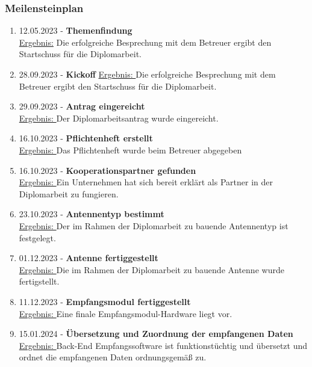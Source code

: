 \subsubsection{Meilensteinplan}

\begin{enumerate}
	\item 12.05.2023 - \textbf{Themenfindung}\\
	\underline{Ergebnis:} Die erfolgreiche Besprechung mit dem Betreuer ergibt den Startschuss für die 
	Diplomarbeit.
	
	\item 28.09.2023 - \textbf{Kickoff}
	\underline{Ergebnis: }Die erfolgreiche Besprechung mit dem Betreuer ergibt den Startschuss für die 
	Diplomarbeit.
	
	\item 29.09.2023 - \textbf{Antrag eingereicht}\\
	\underline{Ergebnis: }Der Diplomarbeitsantrag wurde eingereicht.
	
	\item 16.10.2023 - \textbf{Pflichtenheft erstellt}\\
	\underline{Ergebnis: }Das Pflichtenheft wurde beim Betreuer abgegeben 
	
	\item 16.10.2023 - \textbf{Kooperationspartner gefunden}\\
	\underline{Ergebnis: }Ein Unternehmen hat sich bereit erklärt als Partner in der Diplomarbeit zu fungieren. 
	
	\item 23.10.2023 - \textbf{Antennentyp bestimmt}\\
	\underline{Ergebnis: }Der im Rahmen der Diplomarbeit zu bauende Antennentyp ist festgelegt. 
	
	\item 01.12.2023 - \textbf{Antenne fertiggestellt}\\
	\underline{Ergebnis: }Die im Rahmen der Diplomarbeit zu bauende Antenne wurde fertigstellt.
	
	\item 11.12.2023 - \textbf{Empfangsmodul fertiggestellt}\\
	\underline{Ergebnis: }Eine finale Empfangsmodul-Hardware liegt vor. 
	
	\item 15.01.2024 - \textbf{Übersetzung und Zuordnung der empfangenen Daten}\\
	\underline{Ergebnis: }Back-End Empfangssoftware ist funktionstüchtig und übersetzt und ordnet die 
	empfangenen Daten ordnungsgemäß zu.
	

\end{enumerate}
